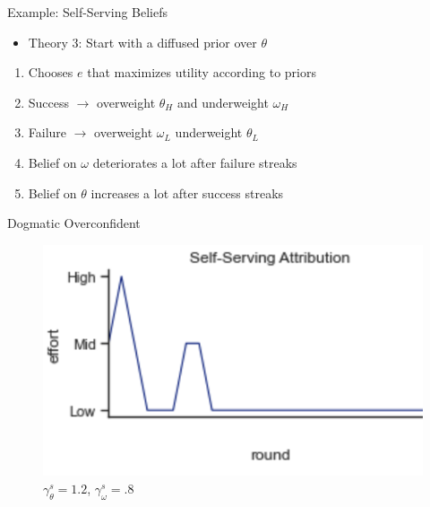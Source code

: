 \documentclass[aspectratio=169]{beamer}
\begin{document}
\begin{frame}{Example: Self-Serving Beliefs}
\begin{itemize}
    \item Theory 3: Start with a diffused prior over $\theta$
    \end{itemize}
    \bigskip
    \begin{enumerate}
        \item Chooses $e$ that maximizes utility according to priors
        \bigskip
        \item Success $\rightarrow$ overweight $\theta_H$ and underweight $\omega_H$\\
        \item Failure $\rightarrow$ overweight $\omega_L$ underweight $\theta_L$\\
        \bigskip
        \item Belief on $\omega$ deteriorates a lot after failure streaks
        \item Belief on $\theta$ increases a lot after success streaks\\
    \end{enumerate}
    
    
\end{frame}

\begin{frame}{Dogmatic Overconfident}
    \begin{figure}
        \centering
        \includegraphics{figures/SS.png}
        \caption{$\gamma^s_\theta=1.2$, $\gamma^s_\omega = .8$}
    \end{figure}
\end{frame}
\end{document}
